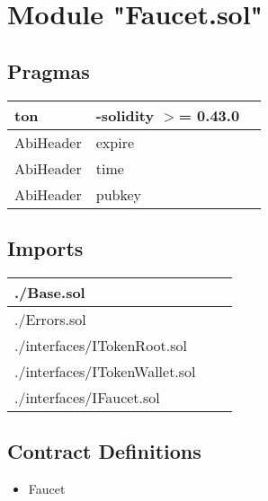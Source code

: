 
\section{Module "Faucet.sol"}


\subsection{Pragmas}


\noindent\begin{tabular}{|l|l|p{5cm}|}\hline
ton & -solidity $>$= 0.43.0 &\\\hline
AbiHeader &  expire &\\\hline
AbiHeader &  time &\\\hline
AbiHeader &  pubkey &\\\hline
\end{tabular}


\subsection{Imports}


\noindent\begin{tabular}{|l|l|p{5cm}|}\hline
./Base.sol &\\\hline
./Errors.sol &\\\hline
./interfaces/ITokenRoot.sol &\\\hline
./interfaces/ITokenWallet.sol &\\\hline
./interfaces/IFaucet.sol &\\\hline
\end{tabular}


\subsection{Contract Definitions}

\begin{itemize}
\item Faucet
\end{itemize}
